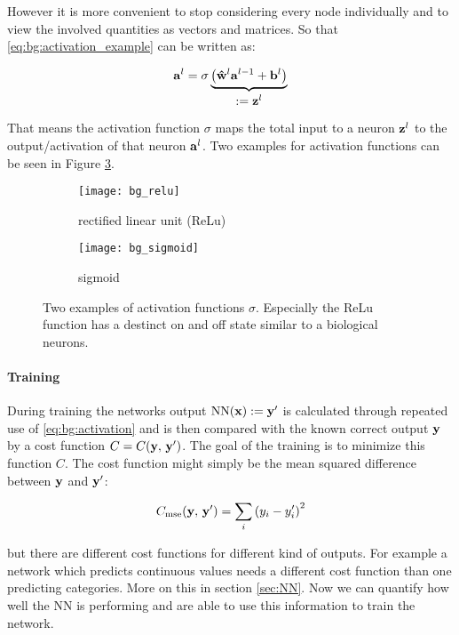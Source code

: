 \noindent
However it is more convenient to stop considering every node individually and to view the involved quantities as vectors and matrices. So that \eqref{eq:bg:activation_example} can be written as:

\begin{equation} \label{eq:bg:activation}
    \vb{a}^l = \sigma \underbrace{
    \qty(\vu{w}^l \vb{a}^{l-1} + \vb{b}^l)
    }_{
    \textstyle
    := \vb z^l
    }
\end{equation}

That means the activation function $\sigma$ maps the total input to a neuron $\vb z^l$ to the output/activation of that neuron $\vb a^l$. Two examples for activation functions can be seen in Figure \ref{fig:al:act}.

\begin{figure}[H]
\centering
\begin{subfigure}{.5\textwidth}
    \centering
    \texttt{[image: bg\_relu]}
    \caption{rectified linear unit (ReLu)}
    \label{}
\end{subfigure}%
\begin{subfigure}{.5\textwidth}
    \centering
    \texttt{[image: bg\_sigmoid]}
    \caption{sigmoid}
    \label{}
\end{subfigure}
\caption{Two examples of activation functions $\sigma$. Especially the ReLu function has a destinct on and off state similar to a biological neurons.}
\label{fig:al:act}
\end{figure}

\paragraph{Training} \label{par:training}
During training the networks output $\mathrm{NN}(\vb x) := \vb{y}' $ is calculated through repeated use of \eqref{eq:bg:activation} and is then compared with the known correct output $\vb y$ by a cost function $C = C(\vb y, \, \vb y')$. The goal of the training is to minimize this function $C$. The cost function might simply be the mean squared difference between $\vb y$ and $\vb y'$:

\begin{equation}
    C_{\mathrm{mse}}(\vb y, \, \vb y') = \sum_i \qty(y_i - y_i')^2
\end{equation}

\noindent
but there are different cost functions for different kind of outputs. For example a network which predicts continuous values needs a different cost function than one predicting categories. More on this in section \ref{sec:NN}. Now we can quantify how well the NN is performing and are able to use this information to train the network.
\\

